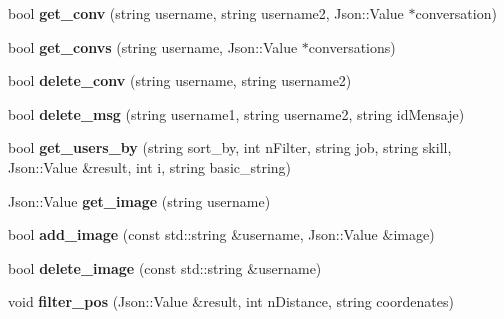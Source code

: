 \begin{DoxyCompactItemize}
\item 
bool {\bfseries get\+\_\+conv} (string username, string username2, Json\+::\+Value $\ast$conversation)\hypertarget{classDatabaseManager_a2925fea0e08b809c7181601b6dc61aec}{}\label{classDatabaseManager_a2925fea0e08b809c7181601b6dc61aec}

\item 
bool {\bfseries get\+\_\+convs} (string username, Json\+::\+Value $\ast$conversations)\hypertarget{classDatabaseManager_a763d89de16988de11f9b54d3e52e2b8e}{}\label{classDatabaseManager_a763d89de16988de11f9b54d3e52e2b8e}

\item 
bool {\bfseries delete\+\_\+conv} (string username, string username2)\hypertarget{classDatabaseManager_add30766200f80b377d1fe656379de808}{}\label{classDatabaseManager_add30766200f80b377d1fe656379de808}

\item 
bool {\bfseries delete\+\_\+msg} (string username1, string username2, string id\+Mensaje)\hypertarget{classDatabaseManager_a3e5169ad61f02a549f78f946d378099c}{}\label{classDatabaseManager_a3e5169ad61f02a549f78f946d378099c}

\item 
bool {\bfseries get\+\_\+users\+\_\+by} (string sort\+\_\+by, int n\+Filter, string job, string skill, Json\+::\+Value \&result, int i, string basic\+\_\+string)\hypertarget{classDatabaseManager_ae2aac313f4cdcbb86ec0fc971b28d7b5}{}\label{classDatabaseManager_ae2aac313f4cdcbb86ec0fc971b28d7b5}

\item 
Json\+::\+Value {\bfseries get\+\_\+image} (string username)\hypertarget{classDatabaseManager_a899a59ca67b49b7b16e0716608725e2b}{}\label{classDatabaseManager_a899a59ca67b49b7b16e0716608725e2b}

\item 
bool {\bfseries add\+\_\+image} (const std\+::string \&username, Json\+::\+Value \&image)\hypertarget{classDatabaseManager_a469ebd4e1d3db9bd9f62905ec944b341}{}\label{classDatabaseManager_a469ebd4e1d3db9bd9f62905ec944b341}

\item 
bool {\bfseries delete\+\_\+image} (const std\+::string \&username)\hypertarget{classDatabaseManager_a3828bd25f7a2ec616ece213de0397d96}{}\label{classDatabaseManager_a3828bd25f7a2ec616ece213de0397d96}

\item 
void {\bfseries filter\+\_\+pos} (Json\+::\+Value \&result, int n\+Distance, string coordenates)\hypertarget{classDatabaseManager_a7e4882c2ad76fa7b7a0976226f3a4ba9}{}\label{classDatabaseManager_a7e4882c2ad76fa7b7a0976226f3a4ba9}


\end{DoxyCompactItemize}
